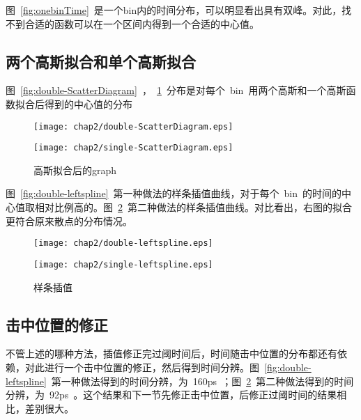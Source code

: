 图~\ref{fig:onebinTime}~是一个bin内的时间分布，可以明显看出具有双峰。对此，找不到合适的函数可以在一个区间内得到一个合适的中心值。

\subsection{两个高斯拟合和单个高斯拟合}

图~\ref{fig:double-ScatterDiagram}~，~\ref{fig:single-ScatterDiagram}~分布是对每个~bin~用两个高斯和一个高斯函数拟合后得到的中心值的分布

\begin{figure}[!h]
\begin{minipage}[!h]{0.5\linewidth}
\texttt{[image: chap2/double-ScatterDiagram.eps]}
\label{fig:double-ScatterDiagram}
\end{minipage}%
\hfill
\begin{minipage}[!h]{0.5\linewidth}
\texttt{[image: chap2/single-ScatterDiagram.eps]}
\label{fig:single-ScatterDiagram}
\end{minipage}
\caption{高斯拟合后的graph}
\end{figure}

图~\ref{fig:double-leftspline}~第一种做法的样条插值曲线，对于每个~bin~的时间的中心值取相对比例高的。图~\ref{fig:single-leftspline}~第二种做法的样条插值曲线。对比看出，右图的拟合更符合原来散点的分布情况。

\begin{figure}[!h]
\begin{minipage}[!h]{0.5\linewidth}
\texttt{[image: chap2/double-leftspline.eps]}
\label{fig:double-leftspline}
\end{minipage}%
\hfill
\begin{minipage}[!h]{0.5\linewidth}
\texttt{[image: chap2/single-leftspline.eps]}
\label{fig:single-leftspline}
\end{minipage}
\caption{样条插值}
\end{figure}

\subsection{击中位置的修正}
不管上述的哪种方法，插值修正完过阈时间后，时间随击中位置的分布都还有依赖，对此进行一个击中位置的修正，然后得到时间分辨。图~\ref{fig:double-leftspline}~第一种做法得到的时间分辨，为~160ps~；图~\ref{fig:single-leftspline}~第二种做法得到的时间分辨，为~92ps~。这个结果和下一节先修正击中位置，后修正过阈时间的结果相比，差别很大。


